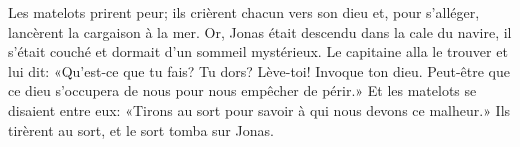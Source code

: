 Les matelots prirent peur; ils crièrent chacun vers son dieu
	et, pour s’alléger, lancèrent la cargaison à la mer.
Or, Jonas était descendu dans la cale du navire,
	il s’était couché et dormait d’un sommeil mystérieux.
Le capitaine alla le trouver et lui dit:
	«Qu’est-ce que tu fais? Tu dors?
	Lève-toi! Invoque ton dieu.
	Peut-être que ce dieu s’occupera de nous pour nous empêcher de périr.»
Et les matelots se disaient entre eux:
	«Tirons au sort pour savoir à qui nous devons ce malheur.»
Ils tirèrent au sort, et le sort tomba sur Jonas.
